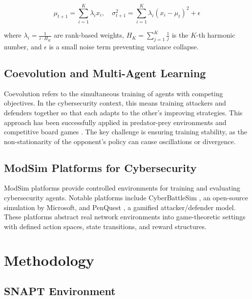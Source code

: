 \documentclass[conference, 10pt]{IEEEtran}
\begin{document}
\begin{equation}
    \mu_{t+1} = \sum_{i=1}^{K} \lambda_i x_i, \quad \sigma_{t+1}^2 = \sum_{i=1}^{K} \lambda_i (x_i - \mu_t)^2 + \epsilon
\end{equation}

\noindent where $\lambda_i = \frac{1}{i \cdot H_K}$ are rank-based weights, $H_K = \sum_{j=1}^{K} \frac{1}{j}$ is the $K$-th harmonic number, and $\epsilon$ is a small noise term preventing variance collapse.

\subsection{Coevolution and Multi-Agent Learning}

Coevolution refers to the simultaneous training of agents with competing objectives. In the cybersecurity context, this means training attackers and defenders together so that each adapts to the other's improving strategies. This approach has been successfully applied in predator-prey environments \cite{potter2000} and competitive board games \cite{schaul2008}. The key challenge is ensuring training stability, as the non-stationarity of the opponent's policy can cause oscillations or divergence.

\subsection{ModSim Platforms for Cybersecurity}

ModSim platforms provide controlled environments for training and evaluating cybersecurity agents. Notable platforms include CyberBattleSim \cite{team2021}, an open-source simulation by Microsoft, and PenQuest \cite{luh2019}, a gamified attacker/defender model. These platforms abstract real network environments into game-theoretic settings with defined action spaces, state transitions, and reward structures.

\section{Methodology}

\subsection{SNAPT Environment}
\end{document}
